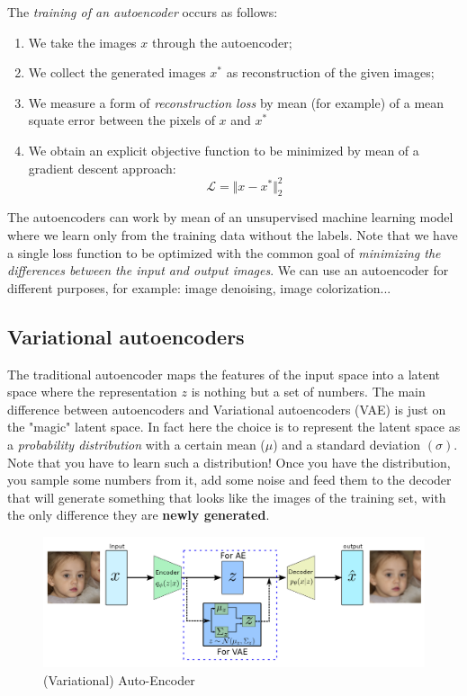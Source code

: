 \noindent
The \textit{training of an autoencoder} occurs as follows: 
\begin{enumerate}
    \itemsep-0.3em 
    \item We take the images $x$ through the autoencoder; 
    \item We collect the generated images $x^*$ as reconstruction of the given images;
    \item We measure a form of \textit{reconstruction loss} by mean (for example) of a mean squate error between the pixels of $x$ and $x^*$
    \item We obtain an explicit objective function to be minimized by mean of a gradient descent approach:
    \begin{equation}
        \mathcal{L}=\Vert x-x^* \Vert_2^2 
    \end{equation}
\end{enumerate}
The autoencoders can work by mean of an unsupervised machine learning model where we learn only from the training data without the labels. Note that we have a single loss function to be optimized with the common goal of \textit{minimizing the differences between the input and output images}.
We can use an autoencoder for different purposes, for example: image denoising, image colorization... 

\subsection{Variational autoencoders}
The traditional autoencoder maps the features of the input space into a latent space where the representation $z$ is nothing but a set of numbers. The main difference between autoencoders and Variational autoencoders (VAE) is just on the "magic" latent space. In fact here the choice is to represent the latent space as a \textit{probability distribution} with a certain mean ($\mu$) and a standard deviation $(\sigma)$. Note that you have to learn such a distribution! Once you have the distribution, you sample some numbers from it, add some noise and feed them to the decoder that will generate something that looks like the images of the training set, with the only difference they are \textbf{newly generated}. 

\begin{figure}[h]
    \centering
    \includegraphics[scale=0.7]{img/VAE.png}
    \caption{(Variational) Auto-Encoder}
\end{figure}


